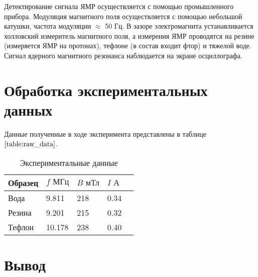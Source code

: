 \documentclass[a4paper, 14pt]{article}
\begin{document}
Детектирование сигнала ЯМР осуществляется с помощью промышленного прибора. Модуляция магнитного поля осуществляется с помощью небольшой катушки, частота модуляции $\approx$ 50 Гц. В зазоре электромагнита устанавливается холловский измеритель магнитного поля, а измерения ЯМР проводятся на резине (измеряется ЯМР на протонах), тефлоне (в состав входит фтор) и тяжелой воде.\\
Сигнал ядерного магнитного резонанса наблюдается на экране осциллографа.




\section*{\textcolor{header}{Обработка экспериментальных данных}}

Данные полученные в ходе эксперимента представлены в таблице $\ref{table:raw_data}$.
\begin{table}[hbtp]
    \begin{center}
    
    \begin{tabular}{|l|l|l|l|l|}
    \hline
    Образец & $f \text{ МГц}$ & $B \text{ мТл}$ & $I \text{ А}$   \\ \hline
    Вода    & 9.811           & 218             & 0.34            \\ \hline
    Резина  & 9.201           & 215             & 0.32            \\ \hline
    Тефлон  & 10.178          & 238             & 0.40            \\ \hline
    \end{tabular}
    \caption{Экспериментальные данные}
    \label{table:raw_data}
\end{center}
\end{table}

\section*{\textcolor{header}{Вывод}}
\end{document}
